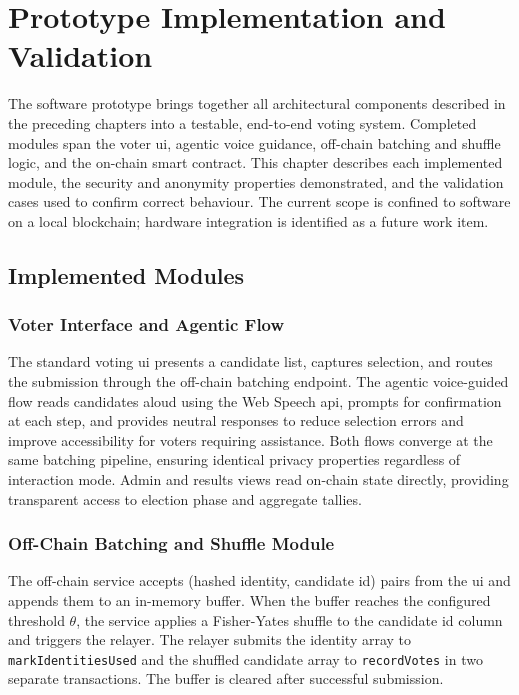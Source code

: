 \chapter{Prototype Implementation and Validation}
The software prototype brings together all architectural components described in the preceding chapters into a testable, end-to-end voting system. Completed modules span the voter \gls{ui}, agentic voice guidance, off-chain batching and shuffle logic, and the on-chain smart contract. This chapter describes each implemented module, the security and anonymity properties demonstrated, and the validation cases used to confirm correct behaviour. The current scope is confined to software on a local blockchain; hardware integration is identified as a future work item.
 
\section{Implemented Modules}
 
\subsection{Voter Interface and Agentic Flow}
 
The standard voting \gls{ui} presents a candidate list, captures selection, and routes the submission through the off-chain batching endpoint. The agentic voice-guided flow reads candidates aloud using the Web Speech \gls{api}, prompts for confirmation at each step, and provides neutral responses to reduce selection errors and improve accessibility for voters requiring assistance. Both flows converge at the same batching pipeline, ensuring identical privacy properties regardless of interaction mode. Admin and results views read on-chain state directly, providing transparent access to election phase and aggregate tallies.
 
\subsection{Off-Chain Batching and Shuffle Module}
 
The off-chain service accepts (hashed identity, candidate \gls{id}) pairs from the \gls{ui} and appends them to an in-memory buffer. When the buffer reaches the configured threshold $\theta$, the service applies a Fisher-Yates shuffle to the candidate \gls{id} column and triggers the relayer. The relayer submits the identity array to \texttt{markIdentitiesUsed} and the shuffled candidate array to \texttt{recordVotes} in two separate transactions. The buffer is cleared after successful submission.
 
